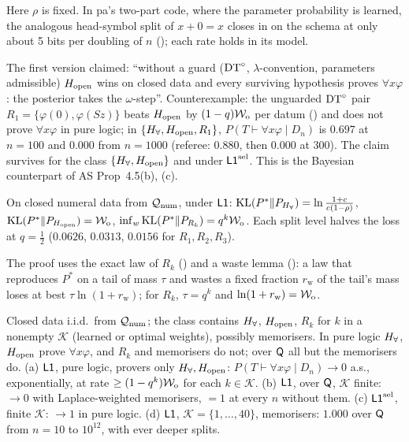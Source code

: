 \noindent Here $\rho$ is fixed. In pa's two-part code, where the parameter probability is learned, the analogous head-symbol split of $x+0=x$ closes in on the schema at only about 5 bits per doubling of $n$ (); each rate holds in its model.

\begin{remark}\label{rem:univ:openrefuted}
The first version claimed: ``without a guard ($\mathrm{DT}^{\circ}$, $\lambda$-convention, parameters admissible) $H_{\mathrm{open}}$ wins on closed data and every surviving hypothesis proves $\forall x\varphi$: the posterior takes the $\omega$-step''. Counterexample: the unguarded $\mathrm{DT}^{\circ}$ pair $R_1=\{\varphi(0),\varphi(Sz)\}$ beats $H_{\mathrm{open}}$ by $(1-q)\mathcal{W}_{\mathrm{o}}$ per datum () and does not prove $\forall x\varphi$ in pure logic; in $\{H_{\forall},H_{\mathrm{open}},R_1\}$, $P(T\vdash\forall x\varphi\mid D_n)$ is $0.697$ at $n=100$ and $0.000$ from $n=1000$ (referee: $0.880$, then $0.000$ at $300$). The claim survives for the class $\{H_{\forall},H_{\mathrm{open}}\}$ and under $\mathord{\mathsf{L1}}^{\mathrm{sel}}$. This is the Bayesian counterpart of AS Prop~4.5(b), (c).
\end{remark}

\begin{proposition}\label{prop:univ:rkrate}
On closed numeral data from $\mathcal{Q}_{\mathrm{num}}$, under $\mathord{\mathsf{L1}}$: $\mathrm{KL}(P^*\|P_{H_{\forall}})=\ln\frac{1+c}{c(1-\rho)}$, $\mathrm{KL}(P^*\|P_{H_{\mathrm{open}}})=\mathcal{W}_{\mathrm{o}}$, $\inf_w\mathrm{KL}(P^*\|P_{R_k})=q^k\mathcal{W}_{\mathrm{o}}$. Each split level halves the loss at $q=\tfrac12$ ($0.0626$, $0.0313$, $0.0156$ for $R_1,R_2,R_3$).
\end{proposition}

\noindent The proof uses the exact law of $R_k$ () and a waste lemma (): a law that reproduces $P^*$ on a tail of mass $\tau$ and wastes a fixed fraction $r_{\mathrm w}$ of the tail's mass loses at best $\tau\ln(1+r_{\mathrm w})$; for $R_k$, $\tau=q^k$ and $\ln(1+r_{\mathrm w})=\mathcal{W}_{\mathrm{o}}$.

\begin{proposition}\label{prop:univ:noguard}
Closed data i.i.d.\ from $\mathcal{Q}_{\mathrm{num}}$; the class contains $H_{\forall}$, $H_{\mathrm{open}}$, $R_k$ for $k$ in a nonempty $\mathcal K$ (learned or optimal weights), possibly memorisers. In pure logic $H_{\forall}$, $H_{\mathrm{open}}$ prove $\forall x\varphi$, and $R_k$ and memorisers do not; over $\mathsf{Q}$ all but the memorisers do. \textup{(a)} $\mathord{\mathsf{L1}}$, pure logic, provers only $H_{\forall},H_{\mathrm{open}}$: $P(T\vdash\forall x\varphi\mid D_n)\to0$ a.s., exponentially, at rate $\ge(1-q^k)\mathcal{W}_{\mathrm{o}}$ for each $k\in\mathcal K$. \textup{(b)} $\mathord{\mathsf{L1}}$, over $\mathsf{Q}$, $\mathcal K$ finite: $\to0$ with Laplace-weighted memorisers, $=1$ at every $n$ without them. \textup{(c)} $\mathord{\mathsf{L1}}^{\mathrm{sel}}$, finite $\mathcal K$: $\to1$ in pure logic. \textup{(d)} $\mathord{\mathsf{L1}}$, $\mathcal K=\{1,\dots,40\}$, memorisers: $1.000$ over $\mathsf{Q}$ from $n=10$ to $10^{12}$, with ever deeper splits.
\end{proposition}

